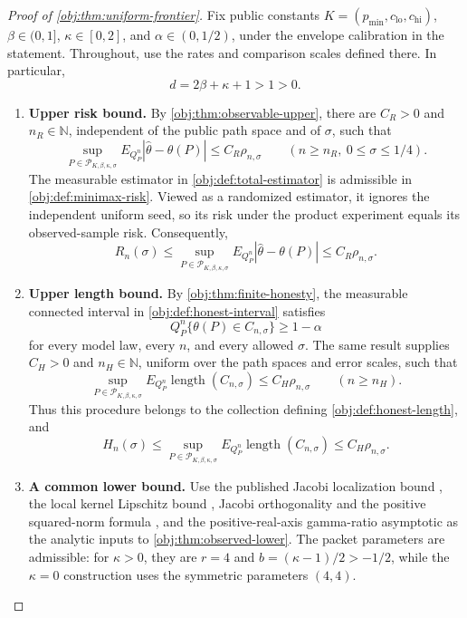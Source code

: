 \begin{proof}[Proof of \cref{obj:thm:uniform-frontier}]
Fix public constants \(K=(p_{\min},c_{\mathrm{lo}},c_{\mathrm{hi}})\), \(\beta\in(0,1]\), \(\kappa\in[0,2]\), and \(\alpha\in(0,1/2)\), under the envelope calibration in the statement. Throughout, use the rates and comparison scales defined there. In particular,
\[
d=2\beta+\kappa+1>1>0.
\]

\begin{enumerate}
\item \textbf{Upper risk bound.}
By \cref{obj:thm:observable-upper}, there are \(C_R>0\) and \(n_R\in\mathbb N\), independent of the public path space and of \(\sigma\), such that
\[
\sup_{P\in\mathcal P_{K,\beta,\kappa,\sigma}}
E_{Q_P^n}|\widehat\theta-\theta(P)|
\le C_R\rho_{n,\sigma}
\qquad
(n\ge n_R,\ 0\le\sigma\le1/4).
\]
The measurable estimator in \cref{obj:def:total-estimator} is admissible in \cref{obj:def:minimax-risk}. Viewed as a randomized estimator, it ignores the independent uniform seed, so its risk under the product experiment equals its observed-sample risk. Consequently,
\[
R_n(\sigma)
\le
\sup_{P\in\mathcal P_{K,\beta,\kappa,\sigma}}
E_{Q_P^n}|\widehat\theta-\theta(P)|
\le C_R\rho_{n,\sigma}.
\]

\item \textbf{Upper length bound.}
By \cref{obj:thm:finite-honesty}, the measurable connected interval in \cref{obj:def:honest-interval} satisfies
\[
Q_P^n\{\theta(P)\in C_{n,\sigma}\}\ge1-\alpha
\]
for every model law, every \(n\), and every allowed \(\sigma\). The same result supplies \(C_H>0\) and \(n_H\in\mathbb N\), uniform over the path spaces and error scales, such that
\[
\sup_{P\in\mathcal P_{K,\beta,\kappa,\sigma}}
E_{Q_P^n}\operatorname{length}(C_{n,\sigma})
\le C_H\rho_{n,\sigma}
\qquad(n\ge n_H).
\]
Thus this procedure belongs to the collection defining \cref{obj:def:honest-length}, and
\[
H_n(\sigma)
\le
\sup_{P\in\mathcal P_{K,\beta,\kappa,\sigma}}
E_{Q_P^n}\operatorname{length}(C_{n,\sigma})
\le C_H\rho_{n,\sigma}.
\]

\item \textbf{A common lower bound.}
Use the published Jacobi localization bound
\citep[Theorem 2.4, equation (2.14)]{PetrushevXu2005},
the local kernel Lipschitz bound
\citep[Theorem 2.2, equation (2.4)]{https://people.math.sc.edu/pencho/Publications/kpx-06-28-06-web.pdf},
Jacobi orthogonality and the positive squared-norm formula
\citep[Table 18.3.1, Jacobi row and caption]{https://dlmf.nist.gov/18.3},
and the positive-real-axis gamma-ratio asymptotic
\citep[equation (5.11.12)]{https://dlmf.nist.gov/5.11.E12}
as the analytic inputs to \cref{obj:thm:observed-lower}.
The packet parameters are admissible: for \(\kappa>0\), they are
\(r=4\) and \(b=(\kappa-1)/2>-1/2\), while the \(\kappa=0\) construction uses the symmetric parameters \((4,4)\).


\end{enumerate}
\end{proof}
